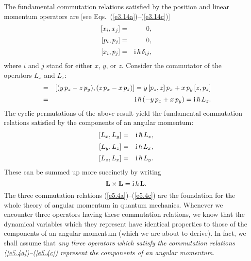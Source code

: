 The fundamental commutation relations satisfied by the
position  and linear momentum operators are [see Eqs.~(\ref{e3.14a})--(\ref{e3.14c})]
\begin{eqnarray}\label{e5.2a}
[x_i, x_j] &=& 0,\\[0.5ex]
[p_i, p_j] &=&0,\\[0.5ex]
[x_i, p_j] &=& {\rm i}\,\hbar \,\delta_{ij},\label{e5.2c}
\end{eqnarray}
where $i$ and $j$ stand for either $x$, $y$, or $z$. 
Consider the commutator of the operators $L_x$ and $L_z$:
\begin{eqnarray}
[L_x, L_y] &= &[(y\,p_z-z\,p_y), (z\,p_x-x \,p_z)]
= y\,[p_z, z]\,p_x + x\,p_y\,[z, p_z] \nonumber\\[0.5ex]
&=& {\rm i}\,\hbar\,(-y \,p_x+ x\,p_y) = {\rm i}\,\hbar\, L_z.
\end{eqnarray}
The cyclic permutations of the above result yield
the fundamental commutation relations satisfied 
by the   components of an angular momentum:
\begin{eqnarray}\label{e5.4a}
[L_x, L_y] &= &{\rm i}\,\hbar\, L_z,\\[0.5ex]
[L_y, L_z] &= &{\rm i}\,\hbar\, L_x,\\[0.5ex]
[L_z, L_x] &= &{\rm i}\,\hbar\, L_y.\label{e5.4c}
\end{eqnarray}
These can be summed up more succinctly by writing
\begin{equation}\label{e5.5}
{\bf L}\times {\bf L} = {\rm i}\,\hbar \,{\bf L}.
\end{equation}
The three commutation relations (\ref{e5.4a})--(\ref{e5.4c})  are the foundation for the whole
theory of angular momentum in quantum mechanics. Whenever we encounter 
three operators having these commutation relations, we know that the
dynamical variables  which they represent have identical properties
to those of the components of an
 angular momentum (which we are about to derive). In fact,
we shall  assume that {\em any three operators which satisfy the commutation
relations (\ref{e5.4a})--(\ref{e5.4c}) represent the components of an angular momentum}. 

